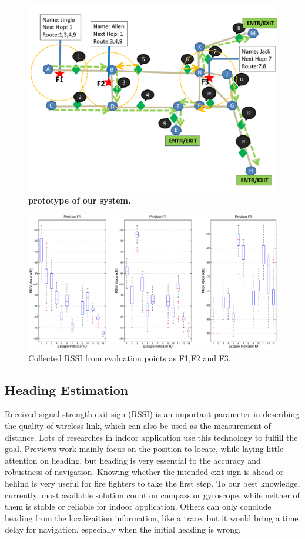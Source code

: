 \documentclass[conference]{IEEEtran}
\begin{document}
      \begin{figure}[!t]
      \centering
      \includegraphics[width=0.8 \linewidth]{pic/floorplanRep.pdf}
      \caption{\bf prototype of our system.}
      \label{fig:usecase}
      \end{figure}

\begin{figure}
\label{fig:RSSIABCD}
\centering
\begin{minipage}[!t]{1\linewidth}
\centering
\includegraphics[width=1\linewidth]{pic/RSSIABCD.eps}
\end{minipage}
\caption{Collected RSSI from evaluation points as F1,F2 and F3.}
\end{figure}


    \subsection{Heading Estimation}
    Received signal strength exit sign (RSSI) is an important parameter in describing the quality of wireless link, which can also be used as the measurement of distance. Lots of researches in indoor application use this technology to fulfill the goal. Previews work mainly focus on the position to locate, while laying little attention on heading, but heading is very essential to the accuracy and robustness of navigation. Knowing whether the intended exit sign is ahead or hehind is very useful for fire fighters to take the first step. To our best knowledge, currently, most available solution count on compass or gyroscope, while neither of them is stable or reliable for indoor application. Others can only conclude heading from the localizaition information, like a trace, but it would bring a time delay for navigation, especially when the initial heading is wrong.
\end{document}
